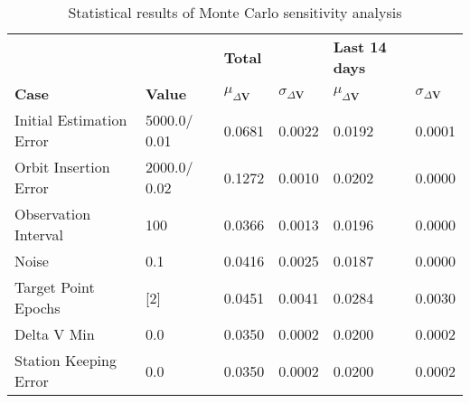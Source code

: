 \begin{table}[h!]
\centering
\begin{tabular}{llllll}
 &  & \cellcolor[HTML]{EFEFEF}\textbf{Total} &  & \cellcolor[HTML]{EFEFEF}\textbf{Last 14 days} &  \\
\rowcolor[HTML]{EFEFEF} 
\textbf{Case} & \textbf{Value} & \textbf{$\mu_{\Delta \boldsymbol{V}}$} & \textbf{$\sigma_{\Delta \boldsymbol{V}}$} & \textbf{$\mu_{\Delta \boldsymbol{V}}$} & \textbf{$\sigma_{\Delta \boldsymbol{V}}$} \\ 
Initial Estimation Error & 5000.0/
0.01 & 0.0681 & 0.0022 & 0.0192 & 0.0001 \\ 
Orbit Insertion Error & 2000.0/
0.02 & 0.1272 & 0.0010 & 0.0202 & 0.0000 \\ 
Observation Interval & 100 & 0.0366 & 0.0013 & 0.0196 & 0.0000 \\ 
Noise & 0.1 & 0.0416 & 0.0025 & 0.0187 & 0.0000 \\ 
Target Point Epochs & [2] & 0.0451 & 0.0041 & 0.0284 & 0.0030 \\ 
Delta V Min & 0.0 & 0.0350 & 0.0002 & 0.0200 & 0.0002 \\ 
Station Keeping Error & 0.0 & 0.0350 & 0.0002 & 0.0200 & 0.0002 \\ 
\end{tabular}
\caption{Statistical results of Monte Carlo sensitivity analysis}
\label{tab:SensitivityAnalysis}
\end{table}